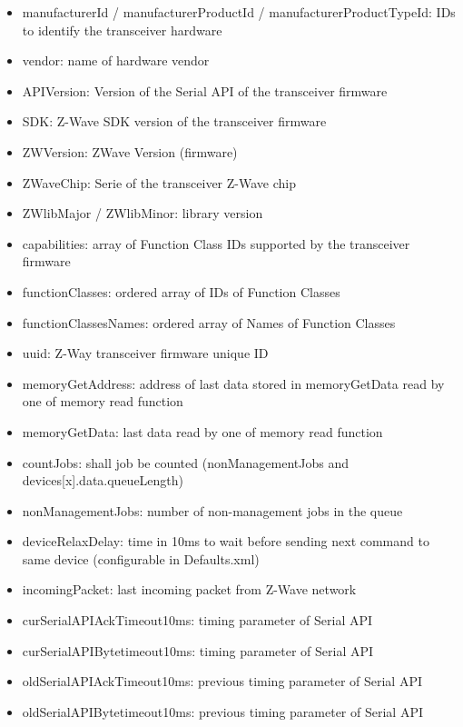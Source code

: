 \begin {itemize}
\begin {itemize}
\begin {itemize}
\item  manufacturerId / manufacturerProductId / manufacturerProductTypeId: IDs to identify the transceiver hardware
\item  vendor: name of hardware vendor
\item  APIVersion: Version of the Serial API of the transceiver firmware
\item  SDK: Z-Wave SDK version of the transceiver firmware
\item  ZWVersion: ZWave Version (firmware)
\item  ZWaveChip: Serie of the transceiver Z-Wave chip
\item  ZWlibMajor / ZWlibMinor: library version 
\item  capabilities: array of Function Class IDs supported by the transceiver firmware
\item  functionClasses: ordered array of IDs of Function Classes
\item  functionClassesNames: ordered array of Names of Function Classes
\item  uuid: Z-Way transceiver firmware unique ID

\item  memoryGetAddress: address of last data stored in memoryGetData read by one of memory read function
\item  memoryGetData: last data read by one of memory read function
\item  countJobs: shall job be counted (nonManagementJobs and devices[x].data.queueLength)
\item  nonManagementJobs: number of non-management jobs in the queue
\item  deviceRelaxDelay: time in 10ms to wait before sending next command to same device (configurable in Defaults.xml)
\item  incomingPacket: last incoming packet from Z-Wave network

\item  curSerialAPIAckTimeout10ms: timing parameter of Serial API
\item  curSerialAPIBytetimeout10ms: timing parameter of Serial API
\item  oldSerialAPIAckTimeout10ms: previous timing parameter of Serial API
\item  oldSerialAPIBytetimeout10ms: previous timing parameter of Serial API
\end {itemize}


\end{itemize}
\end{itemize}
